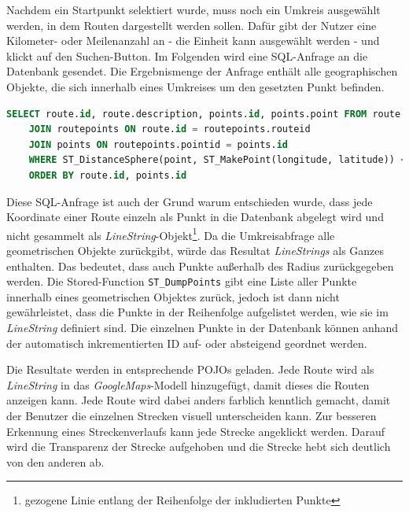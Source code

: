 \documentclass[a4paper,11pt,utf8]{scrartcl}
\begin{document}
Nachdem ein Startpunkt selektiert wurde, muss noch ein Umkreis ausgewählt werden, in dem Routen dargestellt werden sollen. Dafür gibt der Nutzer eine Kilometer- oder Meilenanzahl an - die Einheit kann ausgewählt werden - und klickt auf den Suchen-Button. Im Folgenden wird eine SQL-Anfrage an die Datenbank gesendet. Die Ergebnismenge der Anfrage enthält alle geographischen Objekte, die sich innerhalb eines Umkreises um den gesetzten Punkt befinden.
\begin{lstlisting}[language=sql]
SELECT route.id, route.description, points.id, points.point FROM route 
	JOIN routepoints ON route.id = routepoints.routeid 
	JOIN points ON routepoints.pointid = points.id 
	WHERE ST_DistanceSphere(point, ST_MakePoint(longitude, latitude)) <=  radius * distanceUnit
	ORDER BY route.id, points.id
\end{lstlisting}

Diese SQL-Anfrage ist auch der Grund warum entschieden wurde, dass jede Koordinate einer Route einzeln als Punkt in die Datenbank abgelegt wird und nicht gesammelt als \textit{LineString}-Objekt\footnote{gezogene Linie entlang der Reihenfolge der inkludierten Punkte}. Da die Umkreisabfrage alle geometrischen Objekte zurückgibt, würde das Resultat \textit{LineStrings} als Ganzes enthalten. Das bedeutet, dass auch Punkte außerhalb des Radius zurückgegeben werden. Die Stored-Function \texttt{ST\_DumpPoints} gibt eine Liste aller Punkte innerhalb eines geometrischen Objektes zurück, jedoch ist dann nicht gewährleistet, dass die Punkte in der Reihenfolge aufgelistet werden, wie sie im \textit{LineString} definiert sind. Die einzelnen Punkte in der Datenbank können anhand der automatisch inkrementierten ID auf- oder absteigend geordnet werden.

Die Resultate werden in entsprechende POJOs geladen. Jede Route wird als \textit{LineString} in das \textit{GoogleMaps}-Modell hinzugefügt, damit dieses die Routen anzeigen kann. Jede Route wird dabei anders farblich kenntlich gemacht, damit der Benutzer die einzelnen Strecken visuell unterscheiden kann. Zur besseren Erkennung eines Streckenverlaufs kann jede Strecke angeklickt werden. Darauf wird die Transparenz der Strecke aufgehoben und die Strecke hebt sich deutlich von den anderen ab.
\end{document}
